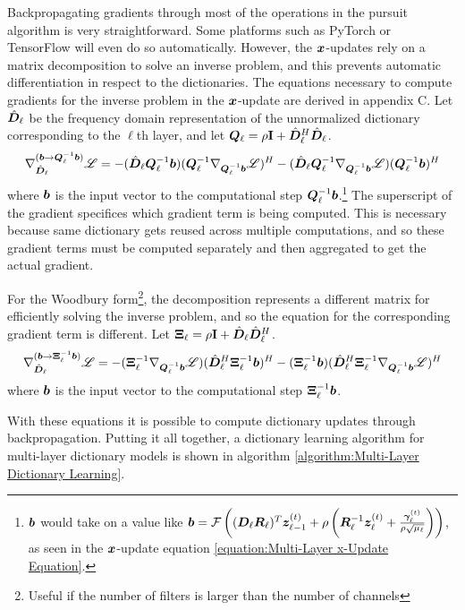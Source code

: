Backpropagating gradients through most of the operations in the pursuit algorithm is very straightforward. Some platforms such as PyTorch \cite{paszke2017automatic} or TensorFlow \cite{tensorflow} will even do so automatically. However, the $\bm{x}$-updates rely on a matrix decomposition to solve an inverse problem, and this prevents automatic differentiation in respect to the dictionaries. The equations necessary to compute gradients for the inverse problem in the $\bm{x}$-update are derived in appendix C.
Let $\hat{\bm{D}}_{\ell}$ be the frequency domain representation of the unnormalized dictionary corresponding to the $\ell$th layer, and let $\bm{Q}_{\ell} = \rho{\bf I} + \hat{\bm{D}}_{\ell}^H\hat{\bm{D}}_{\ell}$.
\begin{equation}
\nabla_{\hat{\bm{D}}_{\ell}}^{(\bm{b} \rightarrow \bm{Q}_{\ell}^{-1}\bm{b})} \mathscr{L} = -(\hat{\bm{D}}_{\ell}\bm{Q}_{\ell}^{-1}\bm{b})(\bm{Q}_{\ell}^{-1}\nabla_{\bm{Q}_{\ell}^{-1}\bm{b}} \mathscr{L})^H - (\hat{\bm{D}}_{\ell}\bm{Q}_{\ell}^{-1}\nabla_{\bm{Q}_{\ell}^{-1}\bm{b}} \mathscr{L}) (\bm{Q}_{\ell}^{-1}\bm{b})^H
\end{equation}
where $\bm{b}$ is the input vector to the computational step $\bm{Q}_{\ell}^{-1}\bm{b}$.\footnote{$\bm{b}$ would take on a value like $\bm{b} = \mathcal{F}\left((\bm{D}_{\ell}\bm{R}_{\ell})^T\bm{z}_{\ell - 1}^{(t)} + \rho \left(\bm{R}_{\ell}^{-1}\bm{z}_{\ell}^{(t)} + \frac{\bm{\gamma}_{\ell}^{(t)}}{\rho\sqrt{\mu_{\ell}}}\right)\right) $, as seen in the $\bm{x}$-update equation \ref{equation:Multi-Layer x-Update Equation}.} The superscript of the gradient specifices which gradient term is being computed. This is necessary because same dictionary gets reused across multiple computations, and so these gradient terms must be computed separately and then aggregated to get the actual gradient.

For the Woodbury form\footnote{Useful if the number of filters is larger than the number of channels}, the decomposition represents a different matrix for efficiently solving the inverse problem, and so the equation for the corresponding gradient term is different.
Let $\bm{\Xi}_{\ell} = \rho{\bf I} + \hat{\bm{D}}_{\ell}\hat{\bm{D}}_{\ell}^H$.
\begin{equation}
\nabla_{\hat{\bm{D}}_{\ell}}^{(\bm{b} \rightarrow \bm{\Xi}_{\ell}^{-1}\bm{b})} \mathscr{L} = -(\bm{\Xi}_{\ell}^{-1}\nabla_{\bm{Q}_{\ell}^{-1}\bm{b}} \mathscr{L})(\hat{\bm{D}}_{\ell}^H\bm{\Xi}_{\ell}^{-1}\bm{b})^H -  (\bm{\Xi}_{\ell}^{-1}\bm{b})(\hat{\bm{D}}_{\ell}^H\bm{\Xi}_{\ell}^{-1}\nabla_{\bm{Q}_{\ell}^{-1}\bm{b}} \mathscr{L})^H
\end{equation}
where $\bm{b}$ is the input vector to the computational step $\bm{\Xi}_{\ell}^{-1}\bm{b}$.

With these equations it is possible to compute dictionary updates through backpropagation.  Putting it all together, a dictionary learning algorithm for multi-layer dictionary models is shown in algorithm \ref{algorithm:Multi-Layer Dictionary Learning}.

